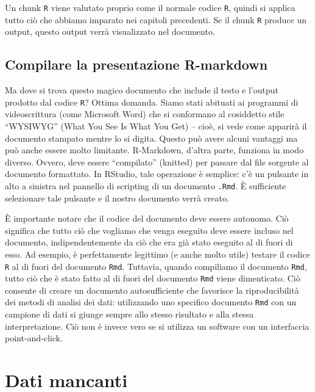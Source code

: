 \documentclass[
]{memoir}
\theoremstyle{definition}
\theoremstyle{definition}
\theoremstyle{definition}
\theoremstyle{definition}
\theoremstyle{remark}
\begin{document}
Un chunk \texttt{R} viene valutato proprio come il normale codice \texttt{R}, quindi si applica tutto ciò che abbiamo imparato nei capitoli precedenti. Se il chunk \texttt{R} produce un output, questo output verrà visualizzato nel documento.

\hypertarget{compilare-la-presentazione-r-markdown}{%
\subsection{Compilare la presentazione R-markdown}\label{compilare-la-presentazione-r-markdown}}

Ma dove si trova questo magico documento che include il testo e l'output prodotto dal codice \texttt{R}? Ottima domanda. Siamo stati abituati ai programmi di videoscrittura (come Microsoft Word) che si conformano al cosiddetto stile ``WYSIWYG'' (What You See Is What You Get) -- cioè, si vede come apparirà il documento stampato mentre lo si digita. Questo può avere alcuni vantaggi ma può anche essere molto limitante. R-Markdown, d'altra parte, funziona in modo diverso. Ovvero, deve essere ``compilato'' (knitted) per passare dal file sorgente al documento formattato. In RStudio, tale operazione è semplice: c'è un pulsante in alto a sinistra nel pannello di scripting di un documento \texttt{.Rmd}. È sufficiente selezionare tale pulsante e il nostro documento verrà creato.

È importante notare che il codice del documento deve essere autonomo. Ciò significa che tutto ciò che vogliamo che venga eseguito deve essere incluso nel documento, indipendentemente da ciò che era già stato eseguito al di fuori di esso. Ad esempio, è perfettamente legittimo (e anche molto utile) testare il codice \texttt{R} al di fuori del documento \texttt{Rmd}. Tuttavia, quando compiliamo il documento \texttt{Rmd}, tutto ciò che è stato fatto al di fuori del documento \texttt{Rmd} viene dimenticato. Ciò consente di creare un documento autosufficiente che favorisce la riproducibilità dei metodi di analisi dei dati: utilizzando uno specifico documento \texttt{Rmd} con un campione di dati si giunge sempre allo stesso risultato e alla stessa interpretazione. Ciò non è invece vero se si utilizza un software con un interfaccia point-and-click.

\hypertarget{dati-mancanti-1}{%
\section{Dati mancanti}\label{dati-mancanti-1}}
\end{document}
